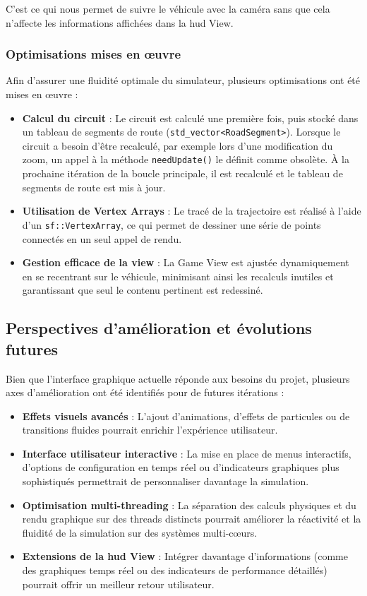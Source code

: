 C'est ce qui nous permet de suivre le véhicule avec la \og caméra \fg{} sans que cela n'affecte les informations affichées dans la \gls{hud} View.

\subsubsection{Optimisations mises en œuvre}\label{subsubsec:optimisations-mises-en-oeuvre}
Afin d'assurer une fluidité optimale du simulateur, plusieurs optimisations ont été mises en œuvre :
\begin{itemize}
    \item \textbf{Calcul du circuit} : Le circuit est calculé une première fois, puis stocké dans un tableau de segments de route (\texttt{\gls{std_vector}<RoadSegment>}\cite{cpp_reference_vector}).
    Lorsque le circuit a besoin d'être recalculé, par exemple lors d'une modification du zoom, un appel à la méthode \texttt{needUpdate()} le définit comme obsolète.
    À la prochaine itération de la boucle principale, il est recalculé et le tableau de segments de route est mis à jour.
    \item \textbf{Utilisation de Vertex Arrays} : Le tracé de la trajectoire est réalisé à l'aide d'un \texttt{sf::VertexArray}\cite{sfml_sf_vertexarray}, ce qui permet de dessiner une série de points connectés en un seul appel de rendu.
    \item \textbf{Gestion efficace de la \gls{view}} : La Game View est ajustée dynamiquement en se recentrant sur le véhicule, minimisant ainsi les recalculs inutiles et garantissant que seul le contenu pertinent est redessiné.
\end{itemize}

\subsection{Perspectives d'amélioration et évolutions futures}\label{subsec:perspectives-d-evolution}
Bien que l'interface graphique actuelle réponde aux besoins du projet, plusieurs axes d'amélioration ont été identifiés pour de futures itérations :
\begin{itemize}
    \item \textbf{Effets visuels avancés} : L'ajout d'animations, d'effets de particules ou de transitions fluides pourrait enrichir l'expérience utilisateur.
    \item \textbf{Interface utilisateur interactive} : La mise en place de menus interactifs, d'options de configuration en temps réel ou d'indicateurs graphiques plus sophistiqués permettrait de personnaliser davantage la simulation.
    \item \textbf{Optimisation multi-threading} : La séparation des calculs physiques et du rendu graphique sur des threads distincts pourrait améliorer la réactivité et la fluidité de la simulation sur des systèmes multi-cœurs.
    \item \textbf{Extensions de la \gls{hud} View} : Intégrer davantage d'informations (comme des graphiques temps réel ou des indicateurs de performance détaillés) pourrait offrir un meilleur retour utilisateur.
\end{itemize}

